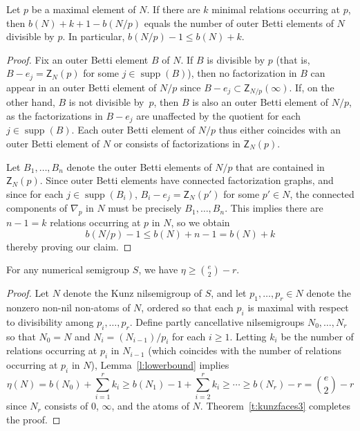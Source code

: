 \documentclass[ALCO]{cedram}
\DeclareMathOperator\supp{supp}
\begin{document}
\begin{lemma}\label{l:lowerbound}
Let $p$ be a maximal element of $N$. If there are $k$ minimal relations occurring at $p$, then $b(N) + k + 1 - b(N/p)$ equals the number of outer Betti elements of $N$ divisible by $p$.  In particular, $b(N/p) - 1 \le b(N) + k$.  
\end{lemma}

\begin{proof}
Fix an outer Betti element $B$ of $N$.  If $B$ is divisible by $p$ (that is, $B - e_j = \mathsf Z_N(p)$ for some $j \in \supp(B)$), then no factorization in $B$ can appear in an outer Betti element of $N/p$ since $B - e_j \subset \mathsf Z_{N/p}(\infty)$.  If, on the other hand, $B$ is not divisible by~$p$, then $B$ is also an outer Betti element of $N/p$, as the factorizations in $B - e_j$ are unaffected by the quotient for each $j \in \supp(B)$.  Each outer Betti element of $N/p$ thus either coincides with an outer Betti element of $N$ or consists of factorizations in $\mathsf Z_N(p)$.  

Let $B_1, \ldots, B_n$ denote the outer Betti elements of $N/p$ that are contained in $\mathsf Z_N(p)$.
Since outer Betti elements have connected factorization graphs, and since for each $j \in \supp(B_i)$, $B_i - e_j = \mathsf Z_N(p')$ for some $p' \in N$, the connected components of $\nabla_p$ in $N$ must be precisely $B_1, \ldots, B_n$.  This implies there are $n - 1 = k$ relations occurring at $p$ in $N$, so we obtain
\[b(N/p) - 1 \le b(N) + n - 1 = b(N) + k\]
thereby proving our claim.
\end{proof}

\begin{thm}\label{t:lowerbound}
For any numerical semigroup $S$, we have $\eta \ge \binom{e}{2} - r$.
\end{thm}

\begin{proof}
Let $N$ denote the Kunz nilsemigroup of $S$, and let $p_1, \ldots, p_r \in N$ denote the nonzero non-nil non-atoms of $N$, ordered so that each $p_i$ is maximal with respect to divisibility among $p_i, \ldots, p_r$.  Define partly cancellative nilsemigroups $N_0, \ldots, N_r$ so that $N_0 = N$ and $N_i = (N_{i-1})/p_i$ for each $i \ge 1$.  Letting $k_i$ be the number of relations occurring at $p_i$ in $N_{i-1}$ (which coincides with the number of relations occurring at $p_i$ in $N$), Lemma~\ref{l:lowerbound} implies 
\[
\eta(N) = b(N_0) + \sum_{i = 1}^r k_i \ge b(N_1) - 1 + \sum_{i = 2}^r k_i \ge \cdots \ge b(N_r) - r = \binom{e}{2} - r
\]
since $N_r$ consists of $0$, $\infty$, and the atoms of $N$.  Theorem~\ref{t:kunzfaces3} completes the proof.  
\end{proof}
\end{document}
